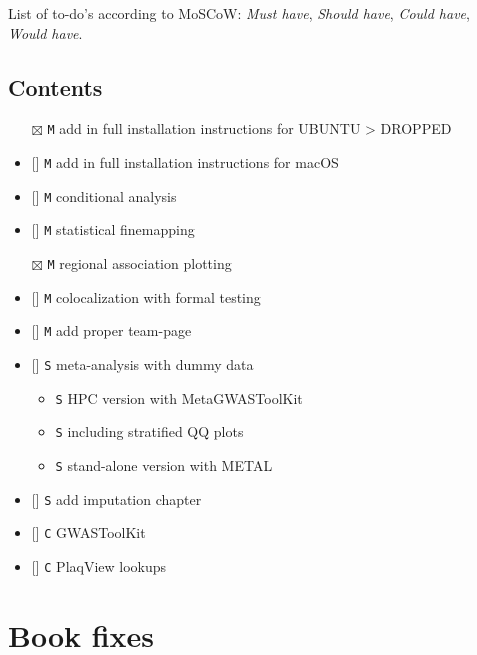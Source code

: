 \documentclass[
]{book}
\newcommand{\passthrough}[1]{#1}
\providecommand{\tightlist}{%
  \setlength{\itemsep}{0pt}\setlength{\parskip}{0pt}}
\begin{document}
List of to-do's according to MoSCoW: \emph{Must have}, \emph{Should have}, \emph{Could have}, \emph{Would have}.

\hypertarget{contents}{%
\subsection{Contents}\label{contents}}

\begin{itemize}
\item[$\boxtimes$]
  \passthrough{\lstinline!M!} add in full installation instructions for UBUNTU \textgreater{} DROPPED
\item
  {[}{]} \passthrough{\lstinline!M!} add in full installation instructions for macOS
\item
  {[}{]} \passthrough{\lstinline!M!} conditional analysis
\item
  {[}{]} \passthrough{\lstinline!M!} statistical finemapping
\item[$\boxtimes$]
  \passthrough{\lstinline!M!} regional association plotting
\item
  {[}{]} \passthrough{\lstinline!M!} colocalization with formal testing
\item
  {[}{]} \passthrough{\lstinline!M!} add proper team-page
\item
  {[}{]} \passthrough{\lstinline!S!} meta-analysis with dummy data

  \begin{itemize}
  \tightlist
  \item
    \passthrough{\lstinline!S!} HPC version with MetaGWASToolKit
  \item
    \passthrough{\lstinline!S!} including stratified QQ plots
  \item
    \passthrough{\lstinline!S!} stand-alone version with METAL
  \end{itemize}
\item
  {[}{]} \passthrough{\lstinline!S!} add imputation chapter
\item
  {[}{]} \passthrough{\lstinline!C!} GWASToolKit
\item
  {[}{]} \passthrough{\lstinline!C!} PlaqView lookups
\end{itemize}

\hypertarget{book-fixes}{%
\section{Book fixes}\label{book-fixes}}
\end{document}
